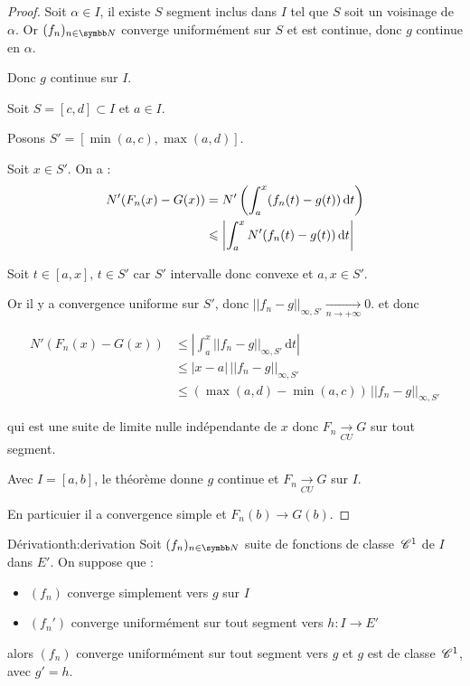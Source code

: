 \begin{proof}
    Soit $\alpha \in I$, il existe $S$ segment inclus dans $I$ tel que $S$ soit un voisinage de $\alpha$. Or 
    $(f_n)_{n \in \N}$ converge uniformément sur $S$ et est continue, donc $g$ continue en $\alpha$. 

    Donc $g$ continue sur $I$.

    \lvspace Soit $S = [c, d] \subset I$ et $a \in I$. 
    
    Posons $S' = [\min(a, c), \max(a, d)]$.

    Soit $x \in S'$. On a :
    \begin{align}
        N'(F_n(x) - G(x)) & = N'\left( \int_a^x (f_n(t) - g(t)) \,\mathrm{d}t \right) \\
        & \leqslant \left| \int_{a}^x N'(f_n(t) - g(t)) \,\mathrm{d}t \right|
    \end{align}

    Soit $t \in [a, x], \, t \in S'$ car $S'$ intervalle donc convexe et $a, x \in S'$. 

    Or il y a convergence uniforme sur $S'$, donc $||f_n - g||_{\infty, S'} \xrightarrow[n\to +\infty]{} 0$.
    et donc 

    \begin{equation*}
    \begin{aligned}
        N'(F_n(x) - G(x)) & \leqslant \left| \int_{a}^{x} ||f_n - g||_{\infty, S'} \,\mathrm{d}t \right| \\
        & \leqslant |x - a| \, ||f_n - g||_{\infty, S'} \\
        & \leqslant (\max(a, d) - \min(a, c)) \, ||f_n - g||_{\infty, S'}
    \end{aligned}
    \end{equation*}

    qui est une suite de limite nulle indépendante de $x$ donc $F_n \xrightarrow[CU]{} G$ sur tout segment. 


    \avspace Avec $I = [a, b]$, le théorème donne $g$ continue et $F_n \xrightarrow[CU]{} G$ sur $I$. 

    En particuier il a convergence simple et $F_n(b) \to G(b)$.
\end{proof}

\begin{theoreme}{Dérivation}{th:derivation}
    Soit $(f_n)_{n \in \N}$ suite de fonctions de classe $\,\mathscr C^{1}$ de $I$ dans $E'$.
    On suppose que : 
    \begin{itemize}
        \item $(f_n)$ converge simplement vers $g$ sur $I$
        \item $(f_n')$ converge uniformément sur tout segment vers $h : I \to E'$
    \end{itemize}

    alors $(f_n)$ converge uniformément sur tout segment vers $g$ et $g$ est de classe $\,\mathscr C^{1}$, 
    avec $g' = h$.
\end{theoreme}

